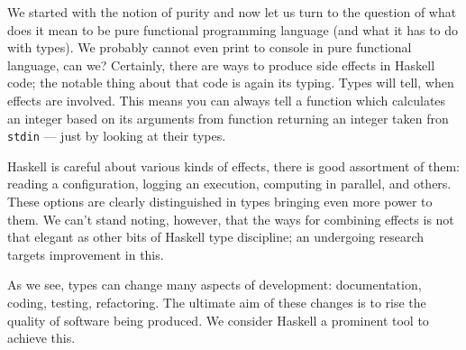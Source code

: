 \documentclass[11pt]{article}
\begin{document}
We started with the notion of purity and now let us turn to the question of what does it mean to be pure functional programming language (and what it has to do with types). We probably cannot even print to console in pure functional language, can we? Certainly, there are ways to produce side effects in Haskell code; the notable thing about that code is again its typing. Types will tell, when effects are involved. This means you can always tell a function which calculates an integer based on its arguments from function returning an integer taken fron \texttt{stdin} --- just by looking at their types.

Haskell is careful about various kinds of effects, there is good assortment of them: reading a configuration, logging an execution, computing in parallel, and others. These options are clearly distinguished in types bringing even more power to them. We can't stand noting, however, that the ways for combining effects is not that elegant as other bits of Haskell type discipline; an undergoing research targets improvement in this.

As we see, types can change many aspects of development: documentation, coding, testing, refactoring. The ultimate aim of these changes is to rise the quality of software being produced. We consider Has\-kell a prominent tool to achieve this.
\end{document}
